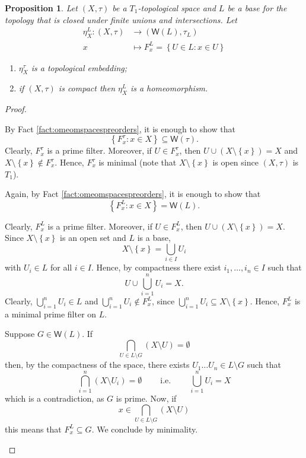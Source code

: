 \documentclass{article}
\newcommand{\corn}[1]{(\mathsf{W}(#1),\tau_{#1})}
\theoremstyle{plain}
\newtheorem{proposition}[theorem]{Proposition}
\theoremstyle{definition}
\theoremstyle{remark}
\newcommand{\bp}[1]{\left\lbrace #1 \right\rbrace}
\newcommand{\0}{\mathbbm 0}
\newcommand{\1}{\mathbbm 1}
\newcommand{\2}{\mathbbm 2}
\begin{document}
\begin{proposition}
    \label{prop:unit}
    Let $(X,\tau)$ be a $T_1$-topological space and \(L\) be a base for the topology that is closed under finite unions and intersections. Let
\begin{align*}
        \eta^L_X: (X,\tau) &\to \corn{L} \\
        x &\mapsto F^L_x=\bp{U \in L: x \in U}
    \end{align*}
    \begin{enumerate}
    \item \label{prop:unit-item1}\(\eta^\tau_X\) is a topological embedding;
        \item \label{prop:unit-item2} if \((X,\tau)\) is compact then \(\eta^L_X\) is a homeomorphism.
    \end{enumerate}
\end{proposition}
\begin{proof}  \( \)
\begin{description}[font=\normalfont\itshape]
\item[\ref{prop:unit-item1}] By Fact \ref{fact:omeomspacespreorders}, it is enough to show that 
\[
\bp{F^\tau_x: x  \in X} \subseteq \mathsf{W}(\tau).
\]
Clearly, $F^\tau_x$ is a prime filter. Moreover, if $U \in F^\tau_x$, then $U \cup ( X \setminus \bp{x})  =X$  and $X \setminus \bp{x} \notin F^\tau_x$. Hence, $F^\tau_x$ is minimal (note that $X \setminus \bp{x}$ is open since $(X,\tau)$ is $T_1$). 


\item[\ref{prop:unit-item2}] Again, by Fact \ref{fact:omeomspacespreorders}, it is enough to show that 
\[
\bp{F^L_x: x  \in X} = \mathsf{W}(L).
\]

    \item[$\bp{F^L_x: x  \in X} \subseteq \mathsf{W}(L)$:] Clearly, $F^L_x$ is a prime filter.   Moreover, if $U \in F^L_x$, then $U \cup ( X \setminus \bp{x})  =X$.  Since \(X \setminus \bp{x}\) is an open set and \(L\) is a base, \[
    X \setminus \bp{x} = \bigcup_{i \in I} U_i
    \]
    with \(U_i \in L\) for all \(i \in I\).
    Hence, by compactness there exist \(i_1, \dots, i_n \in I\) such that \[
    U \cup \bigcup_{i=1}^n U_i=X. 
    \]
    Clearly, \( \bigcup_{i=1}^n U_i \in L\) and \( \bigcup_{i=1}^n U_i \notin F^L_x\), since \(\bigcup_{i=1}^n U_i \subseteq X \setminus \bp{x}\). Hence, \(F^L_x\) is a minimal prime filter on \(L\). 
    \item[$\bp{F^L_x: x  \in X} \supseteq \mathsf{W}(L)$:]  Suppose $G \in \mathsf{W}(L) $. If \[
\bigcap_{U \in L \setminus G}( X \setminus U )= \emptyset
\]
then, by the compactness of the space, there exists $U_1 \dots U_n \in L \setminus G$ such that
\[
\bigcap_{i=1}^n (X \setminus U_i) = \emptyset \quad \quad \mathrm{\ i.e. \ } \quad \quad \bigcup_{i=1}^n  U_i = X
\]
which is a contradiction, as $G$ is prime. Now, if \[
x \in \bigcap_{U \in L \setminus G} (X \setminus U) \]
this means that $F^L_x \subseteq G$. We conclude by minimality.
\end{description}
\end{proof}
\end{document}
